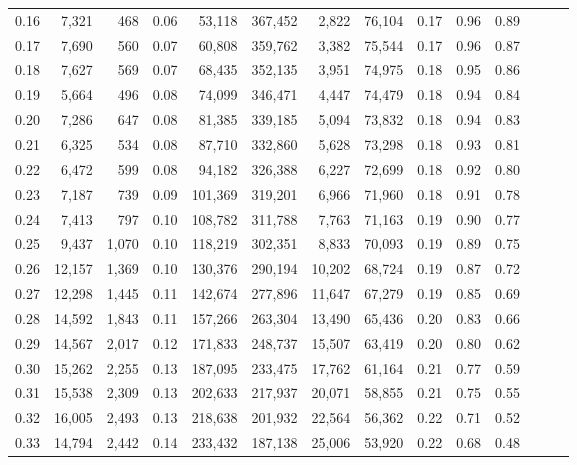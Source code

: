 \begin{tabular}{rrrrrrrrrrrrrr}
0.16 &   7,321 &    468 &  0.06 &   53,118 &  367,452 &   2,822 &  76,104 &  0.17 &  0.96 &      0.89 \\
0.17 &   7,690 &    560 &  0.07 &   60,808 &  359,762 &   3,382 &  75,544 &  0.17 &  0.96 &      0.87 \\
0.18 &   7,627 &    569 &  0.07 &   68,435 &  352,135 &   3,951 &  74,975 &  0.18 &  0.95 &      0.86 \\
0.19 &   5,664 &    496 &  0.08 &   74,099 &  346,471 &   4,447 &  74,479 &  0.18 &  0.94 &      0.84 \\
0.20 &   7,286 &    647 &  0.08 &   81,385 &  339,185 &   5,094 &  73,832 &  0.18 &  0.94 &      0.83 \\
0.21 &   6,325 &    534 &  0.08 &   87,710 &  332,860 &   5,628 &  73,298 &  0.18 &  0.93 &      0.81 \\
0.22 &   6,472 &    599 &  0.08 &   94,182 &  326,388 &   6,227 &  72,699 &  0.18 &  0.92 &      0.80 \\
0.23 &   7,187 &    739 &  0.09 &  101,369 &  319,201 &   6,966 &  71,960 &  0.18 &  0.91 &      0.78 \\
0.24 &   7,413 &    797 &  0.10 &  108,782 &  311,788 &   7,763 &  71,163 &  0.19 &  0.90 &      0.77 \\
0.25 &   9,437 &  1,070 &  0.10 &  118,219 &  302,351 &   8,833 &  70,093 &  0.19 &  0.89 &      0.75 \\
0.26 &  12,157 &  1,369 &  0.10 &  130,376 &  290,194 &  10,202 &  68,724 &  0.19 &  0.87 &      0.72 \\
0.27 &  12,298 &  1,445 &  0.11 &  142,674 &  277,896 &  11,647 &  67,279 &  0.19 &  0.85 &      0.69 \\
0.28 &  14,592 &  1,843 &  0.11 &  157,266 &  263,304 &  13,490 &  65,436 &  0.20 &  0.83 &      0.66 \\
0.29 &  14,567 &  2,017 &  0.12 &  171,833 &  248,737 &  15,507 &  63,419 &  0.20 &  0.80 &      0.62 \\
0.30 &  15,262 &  2,255 &  0.13 &  187,095 &  233,475 &  17,762 &  61,164 &  0.21 &  0.77 &      0.59 \\
0.31 &  15,538 &  2,309 &  0.13 &  202,633 &  217,937 &  20,071 &  58,855 &  0.21 &  0.75 &      0.55 \\
0.32 &  16,005 &  2,493 &  0.13 &  218,638 &  201,932 &  22,564 &  56,362 &  0.22 &  0.71 &      0.52 \\
0.33 &  14,794 &  2,442 &  0.14 &  233,432 &  187,138 &  25,006 &  53,920 &  0.22 &  0.68 &      0.48 \\

\end{tabular}
